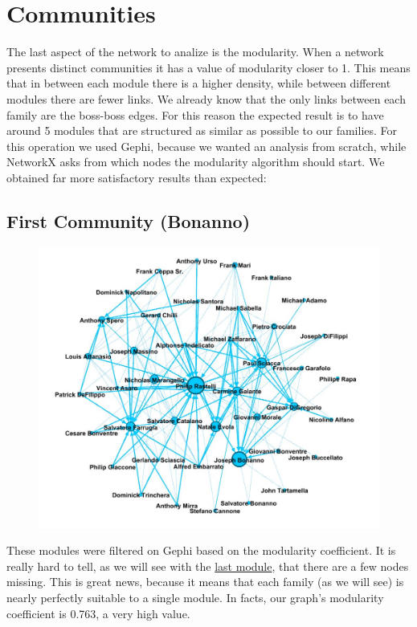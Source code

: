 \documentclass{article}
\begin{document}
\section{\textcolor{Paragrafi}{Communities}}
The last aspect of the network to analize is the modularity. When a network presents distinct communities it has a value of modularity closer to 1. This means that in between each module there is a higher density, while between different modules there are fewer links. We already know that the only links between each family are the boss-boss edges. For this reason the expected result is to have around 5 modules that are structured as similar as possible to our families. For this operation we used Gephi, because we wanted an analysis from scratch, while NetworkX asks from which nodes the modularity algorithm should start. We obtained far more satisfactory results than expected:



\textcolor{Titoli}{\subsection{First Community (Bonanno)}}
\begin{figure}[h!]
\centering
\includegraphics[width=450pt]{bonannomodule.JPG}
\advance\leftskip-1.5cm
\end{figure}



\noindent
These modules were filtered on Gephi based on the modularity coefficient. It is really hard to tell, as we will see with the \hyperlink{extramodule}{last module}, that there are a few nodes missing. This is great news, because it means that each family (as we will see) is nearly perfectly suitable to a single module. In facts, our graph's modularity coefficient is 0.763, a very high value.
\newpage
\end{document}
